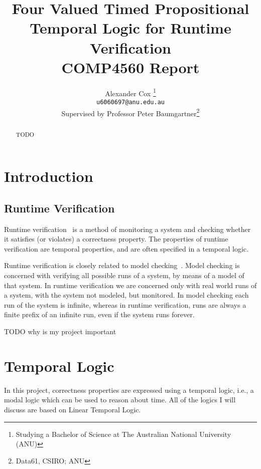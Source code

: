 \documentclass[a4paper]{article}
\title{
  Four Valued Timed Propositional Temporal Logic for Runtime Verification\\
  \normalsize{} COMP4560 Report
}
\author{
  Alexander Cox
  \thanks{Studying a Bachelor of Science at The Australian National University (ANU)}\\
  \small\texttt{u6060697@anu.edu.au}\\
  \normalsize{}Supervised by Professor Peter Baumgartner\thanks{Data61, CSIRO\@; ANU}
}
\begin{document}
\lstset{language=Scala,basicstyle=\ttfamily\small,showstringspaces=false,frame=tl,framerule=1pt,float=tbh,captionpos=b}
\maketitle

\begin{abstract} %
  TODO
\end{abstract}
\newpage
\tableofcontents
\newpage

\section{Introduction}
\subsection{Runtime Verification}
Runtime verification~\autocite{colin2005rv} is a method of monitoring a system and checking whether it satisfies (or violates) a correctness property.
The properties of runtime verification are temporal properties, and are often specified in a temporal logic. %

Runtime verification is closely related to model checking~\autocite{baier2008principles}. Model checking is concerned with verifying all possible runs of a system, by means of a model of that system. In runtime verification we are concerned only with real world runs of a system, with the system not modeled, but monitored. In model checking each run of the system is infinite, whereas in runtime verification, runs are always a finite prefix of an infinite run, even if the system runs forever.

TODO why is my project important

\section{Temporal Logic}
In this project, correctness properties are expressed using a temporal logic, i.e., a modal logic which can be used to reason about time. All of the logics I will discuss are based on Linear Temporal Logic.
\end{document}
